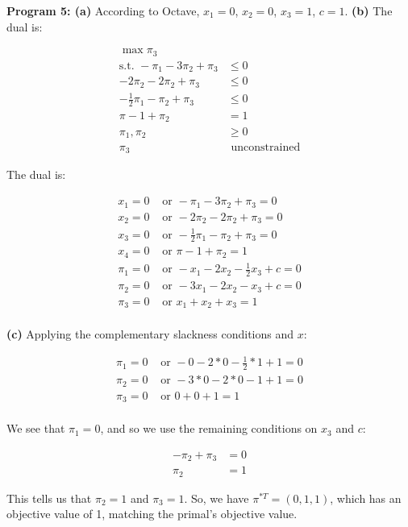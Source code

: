 \documentclass[fleqn]{homework}
\begin{document}
\begin{problem}{2}
    \textbf{Program 5: (a)} According to Octave, $x_1 = 0$, $x_2 = 0$,
    $x_3 = 1$, $c = 1$.  \textbf{(b)} The dual is:

    \begin{align*}
      \max \pi_3 &\\
      \text{s.t. } -\pi_1 - 3\pi_2 + \pi_3 &\le 0 \\
      -2\pi_2 - 2\pi_2 + \pi_3 &\le 0 \\
      -\frac{1}{2}\pi_1 - \pi_2 + \pi_3 &\le 0 \\
      \pi-1 + \pi_2 &= 1 \\
      \pi_1, \pi_2 &\ge 0 \\
      \pi_3 &\text{ unconstrained}
    \end{align*}

    The dual is:

    \begin{align*}
      x_1 = 0 &\text{ or } -\pi_1 - 3\pi_2 + \pi_3 = 0 \\
      x_2 = 0 &\text{ or } -2\pi_2 - 2\pi_2 + \pi_3 = 0 \\
      x_3 = 0 &\text{ or } -\frac{1}{2}\pi_1 - \pi_2 + \pi_3 = 0 \\
      x_4 = 0 &\text{ or } \pi-1 + \pi_2 = 1 \\
      \pi_1 = 0 &\text{ or } -x_1 - 2x_2 - \frac{1}{2}x_3 + c = 0 \\
      \pi_2 = 0 &\text{ or } -3x_1 - 2x_2 - x_3 + c = 0 \\
      \pi_3 = 0 &\text{ or } x_1 + x_2 + x_3 = 1 \\
    \end{align*}

    \textbf{(c)} Applying the complementary slackness conditions and $x$:

    \begin{align*}
      \pi_1 = 0 &\text{ or } -0 - 2*0 - \frac{1}{2}*1 + 1 = 0 \\
      \pi_2 = 0 &\text{ or } -3*0 - 2*0 -1 + 1 = 0 \\
      \pi_3 = 0 &\text{ or } 0 + 0 + 1 = 1 \\
    \end{align*}

    We see that $\pi_1 = 0$, and so we use the remaining conditions on $x_3$ and
    $c$:

    \begin{align*}
      -\pi_2 + \pi_3 &= 0 \\
      \pi_2 &= 1
    \end{align*}

    This tells us that $\pi_2 = 1$ and $\pi_3 = 1$.  So, we have
    $\pi^{*T} = (0, 1, 1)$, which has an objective value of 1, matching the
    primal's objective value.

  \end{problem}
\end{document}
